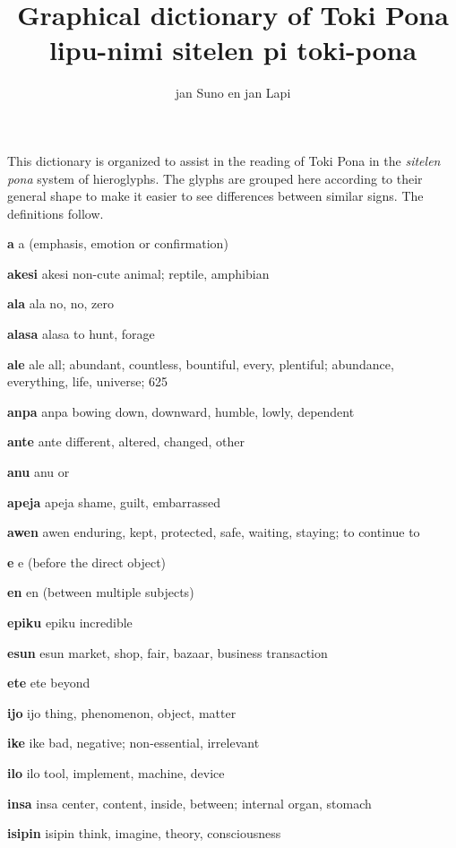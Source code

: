 \documentclass{article}
\title{Graphical dictionary of Toki Pona \\[1ex]{\tpf lipu-nimi sitelen pi toki-pona}}
\author{jan Suno en jan Lapi}
\begin{document}
\maketitle
This dictionary is organized to assist in the reading of
Toki Pona in the \textit{sitelen} \textit{pona}
system of hieroglyphs.  The glyphs are grouped here
according to their general shape to make it easier to
see differences between similar signs.  The definitions
follow.



\pagebreak
\newcommand\tpDef[2]{\textbf{#1} {\large\tpf #1} #2}

\setlength{\parskip}{0.3em}
\begin{multicols}{2}
\raggedright
\begin{hangparas}{1cm}{1}

\tpDef {a}{(emphasis, emotion or confirmation)}

\tpDef {akesi}{non-cute animal; reptile, amphibian}

\tpDef {ala}{no, no, zero}

\tpDef {alasa}{to hunt, forage}

\tpDef {ale}{all; abundant, countless, bountiful, every, plentiful; abundance, everything, life, universe; 625}

\tpDef{anpa}{bowing down, downward, humble, lowly, dependent}

\tpDef {ante}{different, altered, changed, other}

\tpDef {anu}{or}

\tpDef {apeja}{shame, guilt, embarrassed}

\tpDef {awen}{enduring, kept, protected, safe, waiting, staying; to continue to}

\tpDef {e}{(before the direct object)}

\tpDef {en}{(between multiple subjects)}

\tpDef {epiku}{incredible}

\tpDef {esun}{market, shop, fair, bazaar, business transaction}

\tpDef {ete}{beyond}

\tpDef {ijo}{thing, phenomenon, object, matter }

\tpDef {ike}{bad, negative; non-essential, irrelevant}

\tpDef {ilo}{tool, implement, machine, device }

\tpDef {insa}{center, content, inside, between; internal organ, stomach}

\tpDef {isipin}{think, imagine, theory, consciousness}


\end{hangparas}
\end{multicols}
\end{document}
